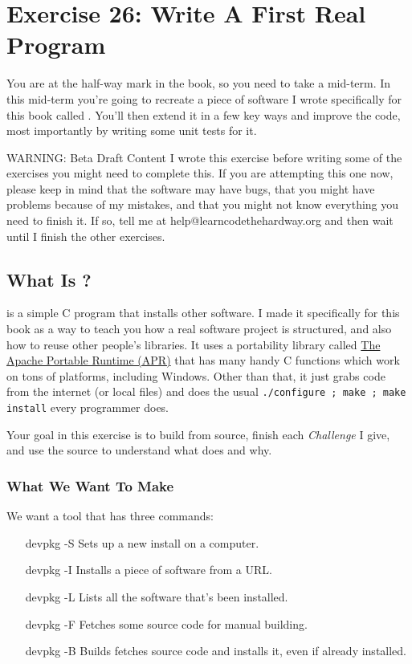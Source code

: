 \chapter{Exercise 26: Write A First Real Program}

You are at the half-way mark in the book, so you need to take a 
mid-term.  In this mid-term you're going to recreate a piece
of software I wrote specifically for this book called .
You'll then extend it in a few key ways and improve the code, most
importantly by writing some unit tests for it.

\begin{aside}{WARNING: Beta Draft Content}
I wrote this exercise before writing some of the exercises you might
need to complete this.  If you are attempting this one now, please
keep in mind that the software may have bugs, that you might have
problems because of my mistakes, and that you might not know everything
you need to finish it.  If so, tell me at help@learncodethehardway.org
and then wait until I finish the other exercises.
\end{aside}

\section{What Is ?}

 is a simple C program that installs other software.  I made it
specifically for this book as a way to teach you how a real software project is
structured, and also how to reuse other people's libraries.  It uses a
portability library called \href{http://apr.apache.org/}{The Apache Portable
Runtime (APR)} that has many handy C functions which work on tons of platforms,
including Windows.  Other than that, it just grabs code from the internet
(or local files) and does the usual \verb|./configure ; make ; make install|
every programmer does.

Your goal in this exercise is to build  from source, 
finish each \emph{Challenge} I give, and use the source to understand
what  does and why.


\subsection{What We Want To Make}

We want a tool that has three commands:

\begin{enumerate}
\item[devpkg -S] Sets up a new install on a computer.
\item[devpkg -I] Installs a piece of software from a URL.
\item[devpkg -L] Lists all the software that's been installed.
\item[devpkg -F] Fetches some source code for manual building.
\item[devpkg -B] Builds fetches source code and installs it, even if already installed.
\end{enumerate}

